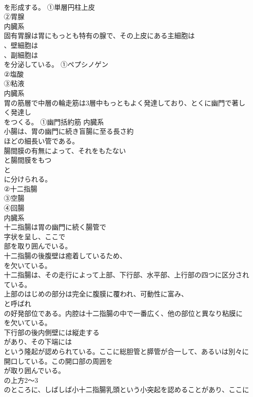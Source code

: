 \documentclass[8pt]{extreport}
\begin{document}
\begin{CJK}{UTF8}{min}
\\	を形成する。	①単層円柱上皮
\\	②胃腺
\\	内臓系
\\	固有胃腺は胃にもっとも特有の腺で、その上皮にある主細胞は
\\	、壁細胞は
\\	、副細胞は
\\	を分泌している。	①ペプシノゲン
\\	②塩酸
\\	③粘液
\\	内臓系
\\	胃の筋層で中層の輪走筋は3層中もっともよく発達しており、とくに幽門で著しく発達し
\\	をつくる。	①幽門括約筋	内臓系
\\	小腸は、胃の幽門に続き盲腸に至る長さ約
\\	ほどの細長い管である。
\\	腸間膜の有無によって、それをもたない
\\	と腸間膜をもつ
\\	と
\\	に分けられる。	
\\	②十二指腸
\\	③空腸
\\	④回腸
\\	内臓系
\\	十二指腸は胃の幽門に続く腸管で
\\	字状を呈し、ここで
\\	部を取り囲んでいる。
\\	十二指腸の後腹壁は癒着しているため、
\\	を欠いている。
\\	十二指腸は、その走行によって上部、下行部、水平部、上行部の四つに区分されている。
\\	上部のはじめの部分は完全に腹膜に覆われ、可動性に富み、
\\	と呼ばれ
\\	の好発部位である。内腔は十二指腸の中で一番広く、他の部位と異なり粘膜に
\\	を欠いている。
\\	下行部の後内側壁には縦走する
\\	があり、その下端には
\\	という隆起が認められている。ここに総胆管と膵管が合一して、あるいは別々に開口している。この開口部の周囲を
\\	が取り囲んでいる。
\\	の上方2～3
\\	のところに、しばしば小十二指腸乳頭という小突起を認めることがあり、ここに

\end{CJK}
\end{document}
